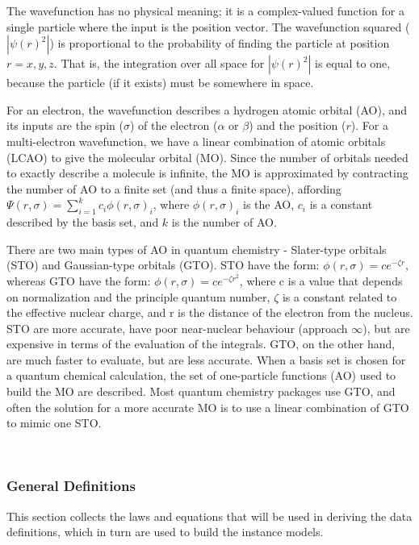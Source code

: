 \documentclass[12pt]{article}
\begin{document}
The wavefunction has no physical meaning; it is a complex-valued function for a 
single particle where the input is the position vector. The wavefunction 
squared ($|\psi(r)^2|$) is proportional to the probability of finding the 
particle at position $r = x,y,z$. That is, the integration over all space for 
$|\psi(r)^2|$ is equal to one, because the particle (if it exists) must be 
somewhere in space.

For an electron, the wavefunction describes a hydrogen atomic orbital (AO), and 
its inputs are the spin ($\sigma$) of the electron ($\alpha$ or $\beta$) and 
the position ($r$). For a multi-electron wavefunction, we have a linear 
combination of atomic orbitals (LCAO) to give the molecular orbital (MO). Since 
the number of orbitals needed to exactly describe a molecule is infinite, the 
MO is approximated by contracting the number of AO to a finite set (and thus a 
finite space), affording $\Psi(r, \sigma) = \sum\limits_{i=1}^{k}c_i 
\phi(r,\sigma)_i$, where $\phi(r,\sigma)_i$ is the AO, $c_i$ is a constant  
described by the basis set, and $k$ is the number of AO.

There are two main types of AO in quantum chemistry - Slater-type orbitals 
(STO) and Gaussian-type orbitals (GTO). STO have the form: $\phi(r,\sigma) = 
ce^{-\zeta r}$, whereas GTO have the form: $\phi(r,\sigma) = ce^{-\zeta r^2}$, 
where c is a value that depends on normalization and 
the principle quantum 
number, $\zeta$ is a constant related to the effective nuclear charge, and r is 
the distance of the electron from the nucleus. STO are more accurate, have poor 
near-nuclear behaviour (approach $\infty$), but are expensive in terms of the 
evaluation of the integrals. GTO, on the other hand, are much faster to 
evaluate, but are less accurate. When a basis set is chosen for a quantum 
chemical calculation, the set of one-particle functions (AO) used to build the 
MO are described. Most quantum chemistry packages use GTO, and often the 
solution for a more accurate MO is to use a linear combination of GTO to mimic 
one STO. 

~\newline

\subsubsection{General Definitions}\label{sec_gendef}

This section collects the laws and equations that will be used in deriving the
data definitions, which in turn are used to build the instance models.
  
\end{document}
